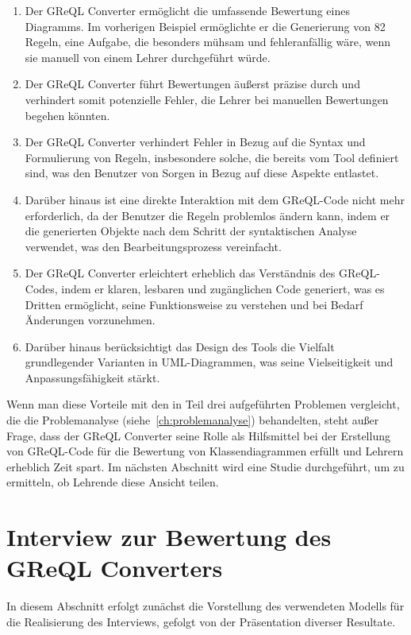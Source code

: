\begin{enumerate}
    \item Der GReQL Converter ermöglicht die umfassende Bewertung eines Diagramms. Im vorherigen Beispiel ermöglichte er
die Generierung von 82 Regeln, eine Aufgabe, die besonders mühsam und fehleranfällig wäre, wenn sie manuell von einem
Lehrer durchgeführt würde.
    \item Der GReQL Converter führt Bewertungen äußerst präzise durch und verhindert somit potenzielle Fehler, die
Lehrer bei manuellen Bewertungen begehen könnten.
    \item Der GReQL Converter verhindert Fehler in Bezug auf die Syntax und Formulierung von Regeln, insbesondere
solche, die bereits vom Tool definiert sind, was den Benutzer von Sorgen in Bezug auf diese Aspekte entlastet.
    \item Darüber hinaus ist eine direkte Interaktion mit dem GReQL-Code nicht mehr erforderlich, da der Benutzer die
Regeln problemlos ändern kann, indem er die generierten Objekte nach dem Schritt der syntaktischen Analyse verwendet,
was den Bearbeitungsprozess vereinfacht.
    \item Der GReQL Converter erleichtert erheblich das Verständnis des GReQL-Codes, indem er klaren, lesbaren und
zugänglichen Code generiert, was es Dritten ermöglicht, seine Funktionsweise zu verstehen und bei Bedarf Änderungen
vorzunehmen.
    \item Darüber hinaus berücksichtigt das Design des Tools die Vielfalt grundlegender Varianten in UML-Diagrammen,
was seine Vielseitigkeit und Anpassungsfähigkeit stärkt.
\end{enumerate}

Wenn man diese Vorteile mit den in Teil drei aufgeführten Problemen vergleicht, die die
Problemanalyse (siehe~\ref{ch:problemanalyse}) behandelten, steht außer Frage, dass der GReQL Converter seine Rolle als
Hilfsmittel bei der Erstellung von GReQL-Code für die Bewertung von Klassendiagrammen erfüllt und Lehrern erheblich
Zeit spart. Im nächsten Abschnitt wird eine Studie durchgeführt, um zu ermitteln, ob Lehrende diese Ansicht teilen.

\section{Interview zur Bewertung des GReQL Converters}

In diesem Abschnitt erfolgt zunächst die Vorstellung des verwendeten Modells für die Realisierung des Interviews,
gefolgt von der Präsentation diverser Resultate.

